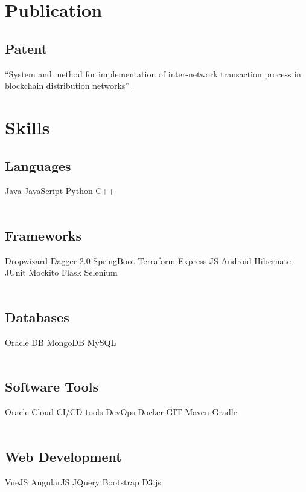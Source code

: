 \documentclass[]{resume-openfont}
\begin{document}
\begin{minipage}[t]{0.33\textwidth}
\section{Publication}
\subsection{Patent}
“System and method for implementation of inter-network transaction process in blockchain distribution networks”  | \href{https://patentscope.wipo.int/search/en/detail.jsf?docId=IN326376132}{\faLink}



\section{Skills}
\subsection{Languages}
Java \textbullet{}   JavaScript \textbullet{} Python \textbullet{} C++ \\~\\
\subsection{Frameworks}
Dropwizard \textbullet{} Dagger 2.0 \textbullet{} SpringBoot \textbullet{} Terraform \textbullet{} Express JS \textbullet{} Android \textbullet{} Hibernate \textbullet{} JUnit \textbullet{} Mockito \textbullet{} Flask \textbullet{} Selenium \\~\\
\subsection{Databases}
Oracle DB \textbullet{} MongoDB \textbullet{} MySQL \\~\\
\subsection{Software Tools}
Oracle Cloud \textbullet{} CI/CD tools \textbullet{} DevOps \textbullet{} Docker \textbullet{} GIT \textbullet{} Maven \textbullet{} Gradle \\~\\
\subsection{Web Development}
VueJS \textbullet{}  AngularJS \textbullet{} JQuery \textbullet{} Bootstrap \textbullet{} D3.js \\~\\

%
%

\end{minipage}
\end{document}
